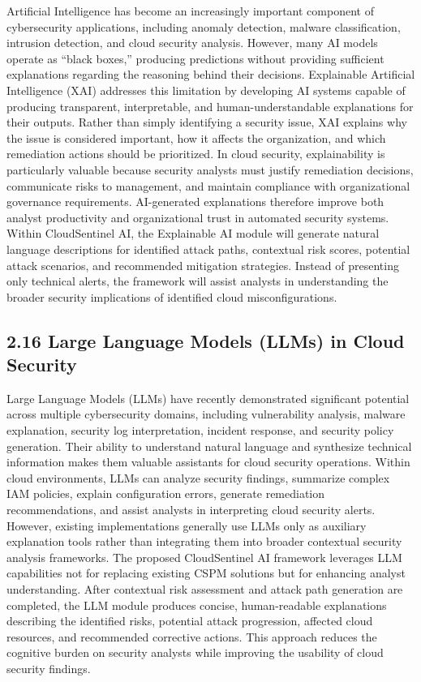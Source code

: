 Artificial Intelligence has become an increasingly important component of cybersecurity applications, including anomaly detection, malware classification, intrusion detection, and cloud security analysis. However, many AI models operate as ``black boxes,'' producing predictions without providing sufficient explanations regarding the reasoning behind their decisions. Explainable Artificial Intelligence (XAI) addresses this limitation \cite{rjoub2023xai,charmet2022xai} by developing AI systems capable of producing transparent, interpretable, and human-understandable explanations for their outputs. Rather than simply identifying a security issue, XAI explains why the issue is considered important, how it affects the organization, and which remediation actions should be prioritized. In cloud security, explainability is particularly valuable because security analysts must justify remediation decisions, communicate risks to management, and maintain compliance with organizational governance requirements. AI-generated explanations therefore improve both analyst productivity and organizational trust in automated security systems. Within CloudSentinel AI, the Explainable AI module will generate natural language descriptions for identified attack paths, contextual risk scores, potential attack scenarios, and recommended mitigation strategies. Instead of presenting only technical alerts, the framework will assist analysts in understanding the broader security implications of identified cloud misconfigurations.

\subsection{2.16 Large Language Models (LLMs) in Cloud Security}

Large Language Models (LLMs) have recently demonstrated \cite{vaswani2017attention,brown2020language,openai2023gpt4} significant potential across multiple cybersecurity domains, including vulnerability analysis, malware explanation, security log interpretation, incident response, and security policy generation. Their ability to understand natural language and synthesize technical information makes them valuable assistants for cloud security operations. Within cloud environments, LLMs can analyze security findings, summarize complex IAM policies, explain configuration errors, generate remediation recommendations, and assist analysts in interpreting cloud security alerts. However, existing implementations generally use LLMs only as auxiliary explanation tools rather than integrating them into broader contextual security analysis frameworks. The proposed CloudSentinel AI framework leverages LLM capabilities not for replacing existing CSPM solutions but for enhancing analyst understanding. After contextual risk assessment and attack path generation are completed, the LLM module produces concise, human-readable explanations describing the identified risks, potential attack progression, affected cloud resources, and recommended corrective actions. This approach reduces the cognitive burden on security analysts while improving the usability of cloud security findings.

